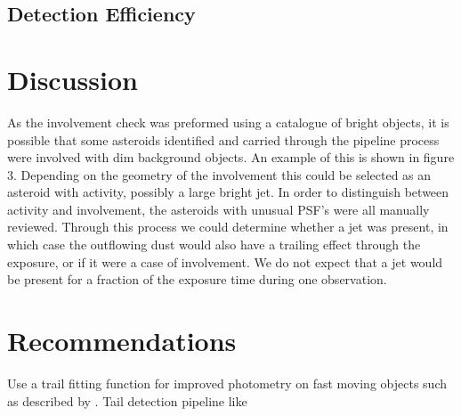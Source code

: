\documentclass[iop,apj]{emulateapj}
\begin{document}
\subsection{Detection Efficiency}


\section{Discussion}

As the involvement check was preformed using a catalogue of bright objects, it is possible that some asteroids identified and carried through the pipeline process were involved with dim background objects. An example of this is shown in figure 3. Depending on the geometry of the involvement this could be selected as an asteroid with activity, possibly a large bright jet. In order to distinguish between activity and involvement, the asteroids with unusual PSF's were all manually reviewed. Through this process we could determine whether a jet was present, in which case the outflowing dust would also have a trailing effect through the exposure, or if it were a case of involvement. We do not expect that a jet would be present for a fraction of the exposure time during one observation. 

\section{Recommendations }

Use a trail fitting function for improved photometry on fast moving objects such as described by \cite{veres12}.
Tail detection pipeline like \cite{sonnett11}




\end{document}
